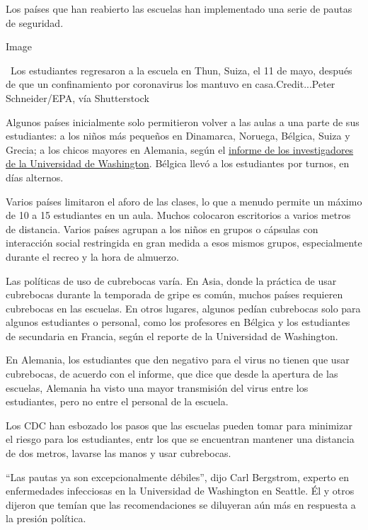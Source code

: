 Los países que han reabierto las escuelas han implementado una serie de
pautas de seguridad.

Image

~Los estudiantes regresaron a la escuela en Thun, Suiza, el 11 de mayo,
después de que un confinamiento por coronavirus los mantuvo en
casa.Credit...Peter Schneider/EPA, vía Shutterstock

Algunos países inicialmente solo permitieron volver a las aulas a una
parte de sus estudiantes: a los niños más pequeños en Dinamarca,
Noruega, Bélgica, Suiza y Grecia; a los chicos mayores en Alemania,
según el
\href{https://globalhealth.washington.edu/sites/default/files/COVID-19\%20Schools\%20Summary\%20\%282\%29.pdf?mkt_tok=eyJpIjoiTkRreE5XWXlORFF3TXpNeCIsInQiOiJIbVNQTTVySEo0Vzk1cHVBZVVqWnFGVmR1UEJxRGdpd01mTXg4OGw3Mk5nTnpmaUoyMGt2UXIwWVZBOE5GVjIybHA5aStrbzJ3MUxsanoxamZibmlocmpSbXZyVFVoV0VHYU1aTGx0RnpsMXlmOEtXSVJqaDJsZ0RJU1BQcVZjZSJ9}{informe
de los investigadores de la Universidad de Washington}. Bélgica llevó a
los estudiantes por turnos, en días alternos.

Varios países limitaron el aforo de las clases, lo que a menudo permite
un máximo de 10 a 15 estudiantes en un aula. Muchos colocaron
escritorios a varios metros de distancia. Varios países agrupan a los
niños en grupos o cápsulas con interacción social restringida en gran
medida a esos mismos grupos, especialmente durante el recreo y la hora
de almuerzo.

Las políticas de uso de cubrebocas varía. En Asia, donde la práctica de
usar cubrebocas durante la temporada de gripe es común, muchos países
requieren cubrebocas en las escuelas. En otros lugares, algunos pedían
cubrebocas solo para algunos estudiantes o personal, como los profesores
en Bélgica y los estudiantes de secundaria en Francia, según el reporte
de la Universidad de Washington.

En Alemania, los estudiantes que den negativo para el virus no tienen
que usar cubrebocas, de acuerdo con el informe, que dice que desde la
apertura de las escuelas, Alemania ha visto una mayor transmisión del
virus entre los estudiantes, pero no entre el personal de la escuela.

Los CDC han esbozado los pasos que las escuelas pueden tomar para
minimizar el riesgo para los estudiantes, entr los que se encuentran
mantener una distancia de dos metros, lavarse las manos y usar
cubrebocas.

``Las pautas ya son excepcionalmente débiles'', dijo Carl Bergstrom,
experto en enfermedades infecciosas en la Universidad de Washington en
Seattle. Él y otros dijeron que temían que las recomendaciones se
diluyeran aún más en respuesta a la presión política.

